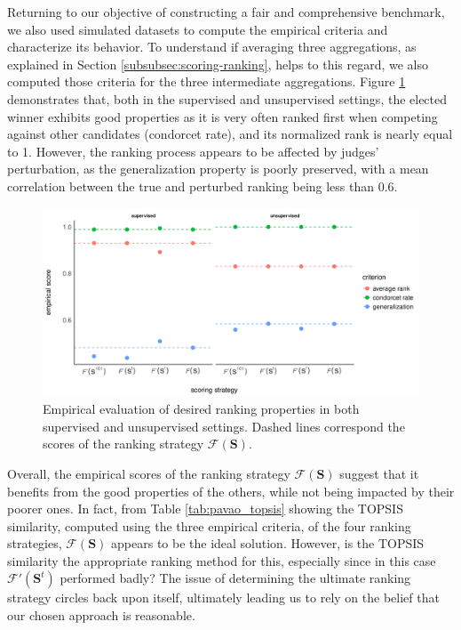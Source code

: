 \documentclass{article}
\begin{document}
Returning to our objective of constructing a fair and comprehensive benchmark, we also used simulated datasets to compute the empirical criteria and characterize its behavior.
To understand if averaging three aggregations, as explained in Section \ref{subsubsec:scoring-ranking}, helps to this regard, we also computed those criteria for the three intermediate aggregations.
Figure \ref{fig:empirical_pavao} demonstrates that, both in the supervised and unsupervised settings, the elected winner exhibits good properties as it is very often ranked first when competing against other candidates (condorcet rate), and its normalized rank is nearly equal to 1.
However, the ranking process appears to be affected by judges' perturbation, as the generalization property is poorly preserved, with a mean correlation between the true and perturbed ranking being less than 0.6.

\begin{figure}[htp]
    \centering
    \includegraphics[width=\textwidth,keepaspectratio]{fig/empirical_pavao.png}
    \caption{Empirical evaluation of desired ranking properties in both supervised and unsupervised settings. Dashed lines correspond the scores of the ranking strategy $\mathcal{F}(\mathbf{S})$.}
    \label{fig:empirical_pavao}
\end{figure}

Overall, the empirical scores of the ranking strategy $\mathcal{F}(\mathbf{S})$ suggest that it benefits from the good properties of the others, while not being impacted by their poorer ones.
In fact, from Table \ref{tab:pavao_topsis} showing the TOPSIS similarity, computed using the three empirical criteria, of the four ranking strategies, $\mathcal{F}(\mathbf{S})$ appears to be the ideal solution.
However, is the TOPSIS similarity the appropriate ranking method for this, especially since in this case $\mathcal{F'}(\mathbf{S}^t)$ performed badly?
The issue of determining the ultimate ranking strategy circles back upon itself, ultimately leading us to rely on the belief that our chosen approach is reasonable.  
\end{document}

